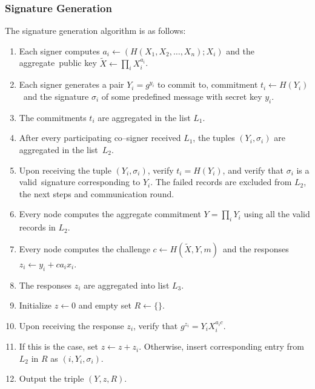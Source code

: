 \subsubsection{Signature Generation}
The signature generation algorithm is as follows:
\begin{enumerate}
    \item Each signer computes ${a_i\leftarrow(H(X_1,X_2,\dots,X_n);X_i)}$ and the aggregate\
    public key ${\tilde{X}\leftarrow\prod_i X_i^{a_i}}$.
    \item Each signer generates a pair $Y_i=g^{y_i}$ to commit to, commitment ${t_i\leftarrow H(Y_i)}$\
    and the signature $\sigma_i$ of some predefined message with secret key $y_i$.
    \item The commitments $t_i$ are aggregated in the list $L_1$.
    \item After every participating co--signer received $L_1$, the tuples ${(Y_i,\sigma_i)}$ are aggregated in the list\
    $L_2$.
    \item Upon receiving the tuple ${(Y_i,\sigma_i)}$, verify ${t_i = H(Y_i)}$, and verify that $\sigma_i$ is a valid\
    signature corresponding to $Y_i$.
    The failed records are excluded from $L_2$, the next steps and communication round.
    \item Every node computes the aggregate commitment ${Y=\prod_i Y_i}$ using all the valid records in $L_2$.
    \item Every node computes the challenge ${c\leftarrow H(\tilde{X}, Y, m)}$\
    and the responses ${z_i\leftarrow y_i + ca_ix_i}$.
    \item The responses $z_i$ are aggregated into list $L_3$.
    \item Initialize $z\leftarrow 0$ and empty set $R\leftarrow\{\}$.
    \item Upon receiving the response $z_i$, verify that ${g^{z_i} = Y_i X_i^{a_ic}}$.
    \item If this is the case, set ${z\leftarrow z+z_i}$.
    Otherwise, insert corresponding entry from $L_2$ in $R$ as ${(i, Y_i, \sigma_i)}$.
    \item Output the triple ${(Y,z,R)}$.
\end{enumerate}


